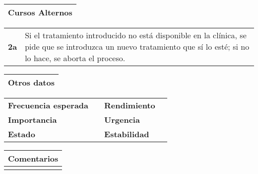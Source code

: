 \documentclass[11pt,a4paper]{article}
\begin{document}
\begin{table}[H]
	\begin{tabularx}{\textwidth}{X}
		\textbf{Cursos Alternos}\\ \hline
	\end{tabularx}
	\begin{tabularx}{\textwidth}{cX}
		\textbf{2a} & Si el tratamiento introducido no está disponible en la clínica, se pide que se introduzca un nuevo tratamiento que sí lo esté; si no lo hace, se aborta el proceso. \\
	\end{tabularx}
\end{table}

\begin{table}[H]
	\begin{tabularx}{\textwidth}{X}
		\textbf{Otros datos}\\ \hline
	\end{tabularx}
	\begin{tabularx}{\textwidth}{lXlX}
		\textbf{Frecuencia esperada} &  & \textbf{Rendimiento} & \\
		\textbf{Importancia} & & \textbf{Urgencia} & \\
		\textbf{Estado} &  & \textbf{Estabilidad} & \\
	\end{tabularx}
	
	\bigskip
	
	\begin{tabularx}{\textwidth}{X}
		\textbf{Comentarios}\\ \hline
		[...] \\
	\end{tabularx}
\end{table}


\newpage




\end{document}
